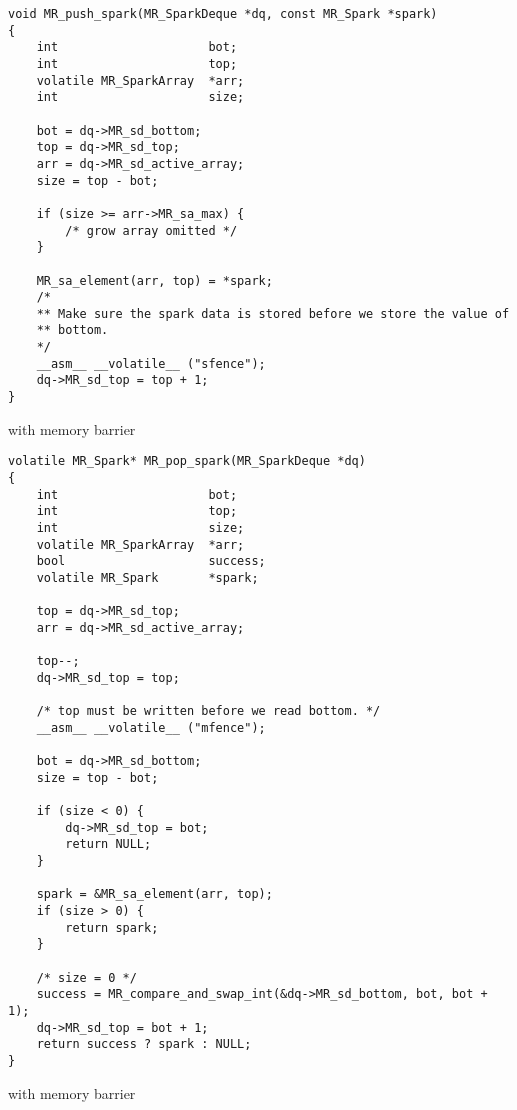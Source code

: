 
\begin{algorithm}[tbp]
\begin{verbatim}
void MR_push_spark(MR_SparkDeque *dq, const MR_Spark *spark)
{
    int                     bot;
    int                     top;
    volatile MR_SparkArray  *arr;
    int                     size;

    bot = dq->MR_sd_bottom;
    top = dq->MR_sd_top;
    arr = dq->MR_sd_active_array;
    size = top - bot;

    if (size >= arr->MR_sa_max) {
        /* grow array omitted */
    }

    MR_sa_element(arr, top) = *spark;
    /*
    ** Make sure the spark data is stored before we store the value of
    ** bottom.
    */
    __asm__ __volatile__ ("sfence");
    dq->MR_sd_top = top + 1;
}
\end{verbatim}
\caption{\push with memory barrier}
\label{alg:MR_push_spark}
\end{algorithm}

\begin{algorithm}[tbp]
\begin{verbatim}
volatile MR_Spark* MR_pop_spark(MR_SparkDeque *dq)
{
    int                     bot;
    int                     top;
    int                     size;
    volatile MR_SparkArray  *arr;
    bool                    success;
    volatile MR_Spark       *spark;
   
    top = dq->MR_sd_top;
    arr = dq->MR_sd_active_array;

    top--;
    dq->MR_sd_top = top;

    /* top must be written before we read bottom. */
    __asm__ __volatile__ ("mfence");

    bot = dq->MR_sd_bottom;
    size = top - bot;

    if (size < 0) {
        dq->MR_sd_top = bot;
        return NULL;
    }

    spark = &MR_sa_element(arr, top);
    if (size > 0) {
        return spark;
    }

    /* size = 0 */
    success = MR_compare_and_swap_int(&dq->MR_sd_bottom, bot, bot + 1);
    dq->MR_sd_top = bot + 1;
    return success ? spark : NULL;
}
\end{verbatim}
\caption{\pop with memory barrier}
\label{alg:MR_pop_spark}
\end{algorithm}

